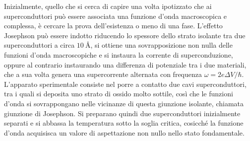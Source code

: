 Inizialmente, quello che si cerca di capire una volta ipotizzato che ai superconduttori può essere associata una funzione d'onda macroscopica e complessa, è cercare la prova dell'esistenza o meno di una fase. L'effetto Josephson può essere indotto riducendo lo spessore dello strato isolante tra due superconduttori a circa $\SI{10}{\angstrom}$, si ottiene una sovrapposizione non nulla delle funzioni d'onda macroscopiche e si instaura la corrente di superconduzione, oppure al contrario instaurando una differenza di potenziale tra i due materiali, che a sua volta genera una supercorrente alternata con frequenza $\omega = 2e\Delta V/\hbar$. L'apparato sperimentale consiste nel porre a contatto due cavi superconduttori, tra i quali si deposita uno strato di ossido molto sottile, così che le funzioni d'onda si sovrappongano nelle vicinanze di questa giunzione isolante, chiamata giunzione di Josephson. Si preparano quindi due superconduttori inizialmente separati e si abbassa la temperatura sotto la soglia critica, cosicché la funzione d'onda acquisisca un valore di aspettazione non nullo nello stato fondamentale. 

